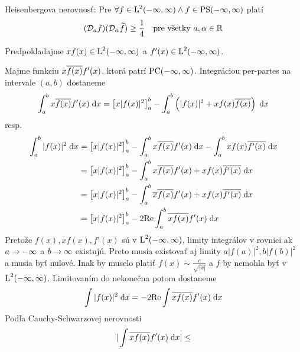 \begin{veta}
    Heisenbergova nerovnosť:
    Pre $\forall f\in \mbox{L}^2(-\infty,\infty) \wedge f\in \mbox{PS}(-\infty,\infty)$ platí
    \begin{equation}
        (\mathcal{D}_{a}f)(\mathcal{D}_{\alpha}\widetilde{f}) \ge \frac{1}{4}
        \quad \text{pre všetky } a,\alpha \in {\mathbb R}
        \label{eq:hei_ineq}
    \end{equation}
\end{veta}
\begin{dokaz}
    Predpokladajme $x f(x) \in \mbox{L}^2(-\infty,\infty)$ a $f'(x)\in \mbox{L}^2(-\infty,\infty)$.

    Majme funkciu $x\overline{f(x)}f'(x)$, ktorá patrí $\mbox{PC}(-\infty,\infty)$. 
    Integráciou per-partes na intervale $(a,b)$ dostaneme
    \begin{equation}
        \int_a^b x\overline{f(x)}f'(x) \; \mathrm{d} x =
          \left[ x|f(x)|^2\right]_a^b -
          \int_a^b \left(|f(x)|^2 + x f(x) \overline{f(x)} \right)
            \; \mathrm{d} x
    \end{equation}
    resp.
    \begin{equation}
    \begin{split}
        \int_a^b |f(x)|^2 \; \mathrm{d} x &=
          \left[ x|f(x)|^2\right]_a^b 
        - \int_a^b x\overline{f(x)}f'(x) \; \mathrm{d} x -
          \int_a^b x f(x) \overline{f'(x)} \; \mathrm{d} x \\
        &= \left[ x|f(x)|^2\right]_a^b 
        - \int_a^b x\overline{f(x)}f'(x) + x f(x) \overline{f'(x)} \; \mathrm{d} x
          \\
        &= \left[ x|f(x)|^2\right]_a^b 
        - \int_a^b \overline{x} \overline{f(x)}f'(x) + x f(x)
          \overline{f'(x)} \; \mathrm{d} x\\
        &= \left[ x|f(x)|^2\right]_a^b 
        - 2 \mbox{Re} \int_a^b \overline{xf(x)}f'(x) \; \mathrm{d} x
    \end{split}
    \end{equation}
    Pretože $f(x),x f(x), f'(x)$ sú v $\mbox{L}^2(-\infty,\infty)$, limity integrálov
    v rovnici ak $a\rightarrow-\infty$ a $b\rightarrow\infty$ existujú.
    Preto musia existovať aj limity $a |f(a)|^2, b |f(b)|^2$ a musia
    byť nulové. Inak by muselo platiť
    $f(x)\sim\frac{c}{\sqrt{|x|}}$ a $f$ by nemohla byť v $\mbox{L}^2(-\infty,\infty)$.
    Limitovaním do nekonečna potom dostaneme
    \begin{equation}
        \int |f(x)|^2 \; \mathrm{d} x= - 2 \mbox{Re} \int \overline{x f(x)}f'(x) \; \mathrm{d} x
        \label{eq:hei_before_cauchy}
    \end{equation}
    Podľa  Cauchy-Schwarzovej nerovnosti
    \begin{equation}
        |\int \conjug{x f(x)}f'(x) \dd x| \le

\end{equation}
\end{dokaz}
